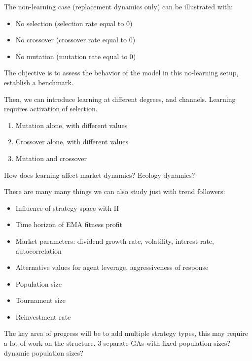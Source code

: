 \documentclass{article}
\begin{document}



The non-learning case (replacement dynamics only) can be illustrated with:
\begin{itemize}
    \item No selection (selection rate equal to 0)
    \item No crossover (crossover rate equal to 0)
    \item No mutation (mutation rate equal to 0)
\end{itemize}
The objective is to assess the behavior of the model in this no-learning setup, establish a benchmark.

Then, we can introduce learning at different degrees, and channels. Learning requires activation of selection.

\begin{enumerate}
    \item Mutation alone, with different values
    \item Crossover alone, with different values
    \item Mutation and crossover
\end{enumerate}

How does learning affect market dynamics? Ecology dynamics?

There are many many things we can also study just with trend followers:
\begin{itemize}
    \item Influence of strategy space with H
    \item Time horizon of EMA fitness profit
    \item Market parameters: dividend growth rate, volatility, interest rate, autocorrelation
    \item Alternative values for agent leverage, aggressiveness of response 
    \item Population size
    \item Tournament size
    \item Reinvestment rate
\end{itemize}

The key area of progress will be to add multiple strategy types, this may require a lot of work on the structure. 3 separate GAs with fixed population sizes? dynamic population sizes?

\printbibliography
\end{document}
